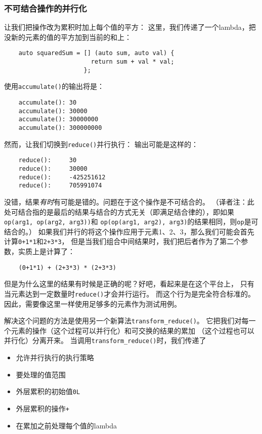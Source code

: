 \subsubsection{不可结合操作的并行化}
让我们把操作改为累积时加上每个值的平方：
这里，我们传递了一个lambda，把没新的元素的值的平方加到当前的和上：
\begin{lstlisting}
    auto squaredSum = [] (auto sum, auto val) {
                        return sum + val * val;
                      };
\end{lstlisting}
使用\texttt{accumulate()}的输出将是：
\begin{lstlisting}
    accumulate(): 30
    accumulate(): 30000
    accumulate(): 30000000
    accumulate(): 300000000
\end{lstlisting}
然而，让我们切换到\texttt{reduce()}并行执行：
输出可能是这样的：
\begin{lstlisting}
    reduce():     30
    reduce():     30000
    reduce():     -425251612
    reduce():     705991074
\end{lstlisting}
没错，结果\emph{有时}有可能是错的。问题在于这个操作是不可结合的。
（译者注：此处可结合指的是最后的结果与结合的方式无关（即满足结合律的），即如果\texttt{op(arg1, op(arg2, arg3))}和
\texttt{op(op(arg1, arg2), arg3)}的结果相同，则\texttt{op}是可结合的。）
如果我们并行的将这个操作应用于元素1、2、3，那么我们可能会首先计算\texttt{0+1*1}和\texttt{2+3*3}，
但是当我们组合中间结果时，我们把后者作为了第二个参数，实质上是计算了：
\begin{lstlisting}
    (0+1*1) + (2+3*3) * (2+3*3)
\end{lstlisting}
但是为什么这里的结果有时候是正确的呢？好吧，看起来是在这个平台上，
只有当元素达到一定数量时\texttt{reduce()}才会并行运行。
而这个行为是完全符合标准的。因此，需要像这里一样使用足够多的元素作为测试用例。

解决这个问题的方法是使用另一个新算法\texttt{transform\_reduce()}。
它把我们对每一个元素的操作（这个过程可以并行化）和可交换的结果的累加
（这个过程也可以并行化）分离开来。
当调用\texttt{transform\_reduce()}时，我们传递了
\begin{itemize}
    \item 允许并行执行的执行策略
    \item 要处理的值范围
    \item 外层累积的初始值\texttt{0L}
    \item 外层累积的操作\texttt{+}
    \item 在累加之前处理每个值的lambda
\end{itemize}


